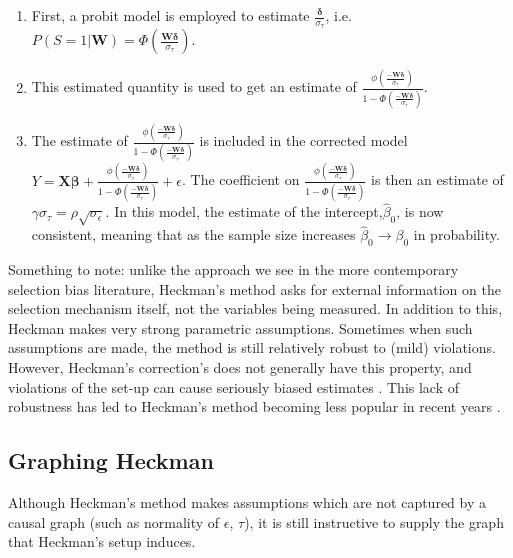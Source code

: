 \documentclass[12pt,twoside]{reedthesis}
\theoremstyle{definition}
\begin{document}
\begin{enumerate}
\item  First, a probit model is employed to estimate $\frac{\boldsymbol{\delta}}{\sigma_\tau}$, i.e. $P(S = 1 | \mathbf{W}) = \Phi(\frac{ \mathbf{W} \boldsymbol{\delta}}{\sigma_{\tau}})$. 

\item This estimated quantity is used to get an estimate of  $\frac{\phi(\frac{-\mathbf{W} \boldsymbol{\delta}}{\sigma_\tau})}{1 - \Phi(\frac{-\mathbf{W} \boldsymbol{\delta}}{\sigma_\tau})}$.

\item The estimate of $\frac{\phi(\frac{-\mathbf{W} \boldsymbol{\delta}}{\sigma_\tau})}{1 - \Phi(\frac{-\mathbf{W} \boldsymbol{\delta}}{\sigma_\tau})}$ is included in the corrected model $Y = \mathbf{X} \boldsymbol{\beta} + \frac{\phi(\frac{-\mathbf{W} \boldsymbol{\delta}}{\sigma_\tau})}{1 - \Phi(\frac{-\mathbf{W} \boldsymbol{\delta}}{\sigma_\tau})} + \epsilon$. The coefficient on $\frac{\phi(\frac{-\mathbf{W} \boldsymbol{\delta}}{\sigma_\tau})}{1 - \Phi(\frac{-\mathbf{W} \boldsymbol{\delta}}{\sigma_\tau})}$ is then an estimate of $\gamma \sigma_\tau = \rho \sqrt{\sigma_\epsilon}$. In this model, the estimate of the intercept,$\hat \beta_0$, is now consistent, meaning that as the sample size increases $\hat \beta_0 \rightarrow \beta_0$ in probability.
\end{enumerate}

Something to note: unlike the approach we see in the more contemporary selection bias literature, Heckman's method asks for external information on the selection mechanism itself, not the variables being measured. In addition to this, Heckman makes very strong parametric assumptions. Sometimes when such assumptions are made, the method is still relatively robust to (mild) violations.  However, Heckman's correction's does not generally have this property, and violations of the set-up can cause seriously biased estimates \citep{Little_1986}. This lack of robustness has led to Heckman's method becoming less popular in recent years \citep{Bushway_2007}.


\subsection{Graphing Heckman}
Although Heckman's method makes assumptions which are not captured by a causal graph (such as normality of $\epsilon$, $\tau$), it is still instructive to supply the graph that Heckman's setup induces. 
\end{document}
